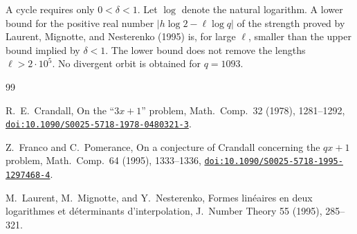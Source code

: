 \documentclass[11pt]{article}
\newcommand{\doilink}[1]{\href{https://doi.org/#1}{\nolinkurl{doi:#1}}}
\begin{document}
A cycle requires only \(0 < \delta < 1\).
Let \(\log\) denote the natural logarithm.
A lower bound for the positive real number \(\lvert h \log 2 - \ell \log q \rvert\) of the strength proved by Laurent, Mignotte, and Nesterenko (1995) is, for large \(\ell\), smaller than the upper bound implied by \(\delta < 1\).
The lower bound does not remove the lengths \(\ell > 2 \cdot 10^5\).
No divergent orbit is obtained for \(q = 1093\).

\begin{thebibliography}{99}

R.~E.~Crandall, On the ``$3x+1$'' problem, Math.\ Comp.\ 32 (1978), 1281--1292, \doilink{10.1090/S0025-5718-1978-0480321-3}.

Z.~Franco and C.~Pomerance, On a conjecture of Crandall concerning the $qx+1$ problem, Math.\ Comp.\ 64 (1995), 1333--1336, \doilink{10.1090/S0025-5718-1995-1297468-4}.

M.~Laurent, M.~Mignotte, and Y.~Nesterenko, Formes lin\'eaires en deux logarithmes et d\'eterminants d'interpolation, J.\ Number Theory 55 (1995), 285--321.

\end{thebibliography}
\end{document}
